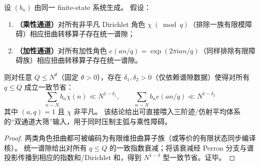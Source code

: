 \begin{proposition}\label{prop:conclusion74-double-large-sieve-input}
设 \((b_n)\) 由同一 finite-state 系统生成。
假设：
\begin{enumerate}
  \item \textbf{（乘性通道）}对所有非平凡 Dirichlet 角色 \(\chi\ (\bmod q)\)（排除一族有限模障碍）相应扭曲转移算子存在统一谱隙；
  \item \textbf{（加性通道）}对所有加性角色 \(e(an/q)=\exp(2\pi\mathrm{i}an/q)\)（同样排除有限障碍族）相应扭曲转移算子存在统一谱隙。
\end{enumerate}
则对任意 \(Q\le N^\theta\)（固定 \(\theta>0\)），存在 \(\delta_1,\delta_2>0\)（仅依赖谱隙数据）使得对所有 \(q\le Q\) 成立一致节省：
\[
\boxed{\;
\sum_{n\sim N} b_n\chi(n)\ll N^{1-\delta_1},\qquad
\sum_{n\sim N} b_n e(an/q)\ll N^{1-\delta_2}\;}
\]
其中 \((a,q)=1\) 且 \(\chi\) 非平凡。
该结论给出可直接喂入三阶迹/仿射平均体系的“双通道大筛”输入，用于同时压制主弧与乘性障碍。
\end{proposition}

\begin{proof}
两类角色扭曲都可被编码为有限维扭曲算子族（或等价的有限状态同步编译核）。
统一谱隙给出对所有 \(q\le Q\) 的一致指数衰减；将该衰减经 Perron 分支与谱投影传播到相应的指数和/Dirichlet 和，得到 \(N^{1-\delta}\) 型一致节省。证毕。
\end{proof}

\endinput
